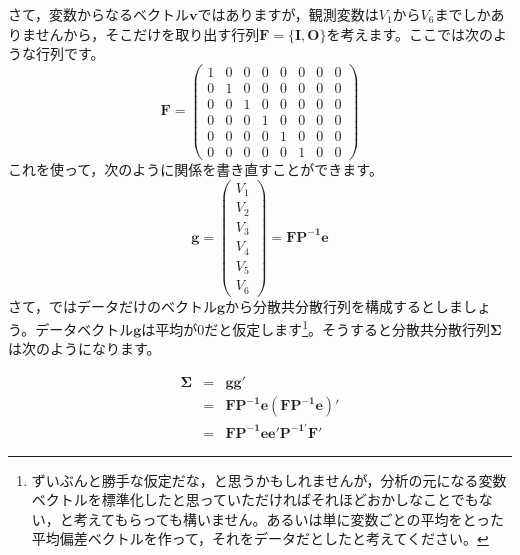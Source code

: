 \documentclass{ltjsbook}
\begin{document}
さて，変数からなるベクトル$\bm{v}$ではありますが，観測変数は$V_1$から$V_6$までしかありませんから，そこだけを取り出す行列$\bm{F}=\{ \bm{I},\bm{O} \}$を考えます。ここでは次のような行列です。
\[
    \bm{F} = 
   \begin{pmatrix} 1 & 0 & 0 & 0 & 0 & 0 & 0 & 0 \\
                            0  & 1 & 0 & 0 & 0 & 0 & 0 & 0 \\
                            0  & 0 & 1 & 0 & 0 & 0 & 0 & 0 \\
                            0  & 0 & 0 & 1 & 0 & 0 & 0 & 0 \\
                            0  & 0 & 0 & 0 & 1 & 0 & 0 & 0 \\
                            0  & 0 & 0 & 0 & 0 & 1 & 0 & 0 \end{pmatrix}
\]  
これを使って，次のように関係を書き直すことができます。
\[
   \bm{g} = \begin{pmatrix}  V_1 \\ V_2 \\ V_3 \\ V_4 \\ V_5 \\ V_6 \end{pmatrix} = \bm{FP^{-1}e}
\]
さて，ではデータだけのベクトル$\bm{g}$から分散共分散行列を構成するとしましょう。データベクトル$\bm{g}$は平均が0だと仮定します\footnote{ずいぶんと勝手な仮定だな，と思うかもしれませんが，分析の元になる変数ベクトルを標準化したと思っていただければそれほどおかしなことでもない，と考えてもらっても構いません。あるいは単に変数ごとの平均をとった平均偏差ベクトルを作って，それをデータだとしたと考えてください。}。そうすると分散共分散行列$\bm{\Sigma}$は次のようになります。

\begin{eqnarray*}
   \bm{\Sigma} &=& \bm{gg'}  \\
                        & = & \bm{ F P^{-1} e ( F P^{-1} e) '} \\
                        & = & \bm{ FP^{-1} ee' P^{-1'} F' } 
\end{eqnarray*}
\end{document}
